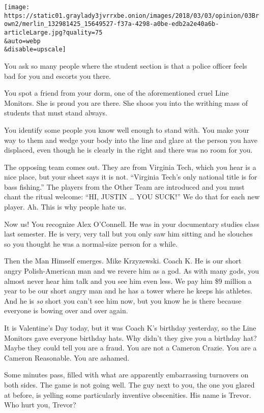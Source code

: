 \texttt{[image: https://static01.graylady3jvrrxbe.onion/images/2018/03/03/opinion/03Brown2/merlin\_132981425\_15649527-f37a-4298-a0be-edb2a2e40a6b-articleLarge.jpg?quality=75\\\&auto=webp\\\&disable=upscale]}

You ask so many people where the student section is that a police
officer feels bad for you and escorts you there.

You spot a friend from your dorm, one of the aforementioned cruel Line
Monitors. She is proud you are there. She shoos you into the writhing
mass of students that must stand always.

You identify some people you know well enough to stand with. You make
your way to them and wedge your body into the line and glare at the
person you have displaced, even though he is clearly in the right and
there was no room for you.

The opposing team comes out. They are from Virginia Tech, which you hear
is a nice place, but your sheet says it is not. ``Virginia Tech's only
national title is for bass fishing.'' The players from the Other Team
are introduced and you must chant the ritual welcome: ``HI, JUSTIN
\ldots{} YOU SUCK!'' We do that for each new player. Ah. This is why
people hate us.

Now us! You recognize Alex O'Connell. He was in your documentary studies
class last semester. He is very, very tall but you only saw him sitting
and he slouches so you thought he was a normal-size person for a while.

Then the Man Himself emerges. Mike Krzyzewski. Coach K. He is our short
angry Polish-American man and we revere him as a god. As with many gods,
you almost never hear him talk and you see him even less. We pay him \$9
million a year to be our short angry man and he has a tower where he
keeps his athletes. And he is \emph{so} short you can't see him now, but
you know he is there because everyone is bowing over and over again.

It is Valentine's Day today, but it was Coach K's birthday yesterday, so
the Line Monitors gave everyone birthday hats. Why didn't they give you
a birthday hat? Maybe they could tell you are a fraud. You are not a
Cameron Crazie. You are a Cameron Reasonable. You are ashamed.

Some minutes pass, filled with what are apparently embarrassing
turnovers on both sides. The game is not going well. The guy next to
you, the one you glared at before, is yelling some particularly
inventive obscenities. His name is Trevor. Who hurt you, Trevor?

